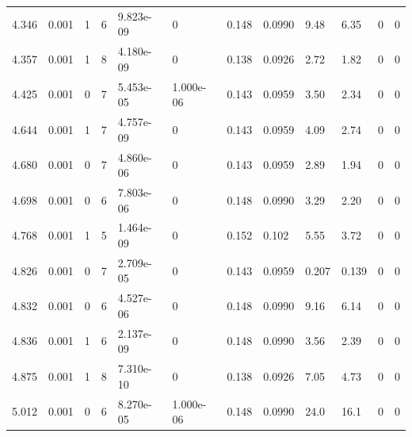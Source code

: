\documentclass[preview]{standalone}
\begin{document}
{{{\begin{tabular}{L{1.2cm}C{1.2cm} C{0.3cm}C{0.5cm} C{1.4cm}C{1.4cm} C{1.4cm}C{1.4cm} C{1.6cm}C{1.6cm} C{1.6cm}C{1.6cm}}
  4.346  &  0.001  & 1     &  6 &  9.823e-09  & 0  &  0.148&   0.0990& 9.48 & 6.35   &  0 & 0  \\ 
  4.357  &  0.001  & 1     &  8 &  4.180e-09  & 0  &  0.138&   0.0926& 2.72 & 1.82   &  0 & 0  \\ 
  4.425  &  0.001  & 0     &  7 &  5.453e-05  & 1.000e-06  &  0.143&   0.0959& 3.50 & 2.34   &  0 & 0  \\ 
  4.644  &  0.001  & 1     &  7 &  4.757e-09  & 0  &  0.143&   0.0959& 4.09 & 2.74   &  0 & 0  \\ 
  4.680  &  0.001  & 0     &  7 &  4.860e-06  & 0  &  0.143&   0.0959& 2.89 & 1.94   &  0 & 0  \\ 
  4.698  &  0.001  & 0     &  6 &  7.803e-06  & 0  &  0.148&   0.0990& 3.29 & 2.20   &  0 & 0  \\ 
  4.768  &  0.001  & 1     &  5 &  1.464e-09  & 0  &  0.152&   0.102& 5.55 & 3.72   &  0 & 0  \\ 
  4.826  &  0.001  & 0     &  7 &  2.709e-05  & 0  &  0.143&   0.0959& 0.207 & 0.139   &  0 & 0  \\ 
  4.832  &  0.001  & 0     &  6 &  4.527e-06  & 0  &  0.148&   0.0990& 9.16 & 6.14   &  0 & 0  \\ 
  4.836  &  0.001  & 1     &  6 &  2.137e-09  & 0  &  0.148&   0.0990& 3.56 & 2.39   &  0 & 0  \\ 
  4.875  &  0.001  & 1     &  8 &  7.310e-10  & 0  &  0.138&   0.0926& 7.05 & 4.73   &  0 & 0  \\ 
  5.012  &  0.001  & 0     &  6 &  8.270e-05  & 1.000e-06  &  0.148&   0.0990& 24.0 & 16.1   &  0 & 0  \\ 
\hline 
\end{tabular} 

}}}
\end{document}
